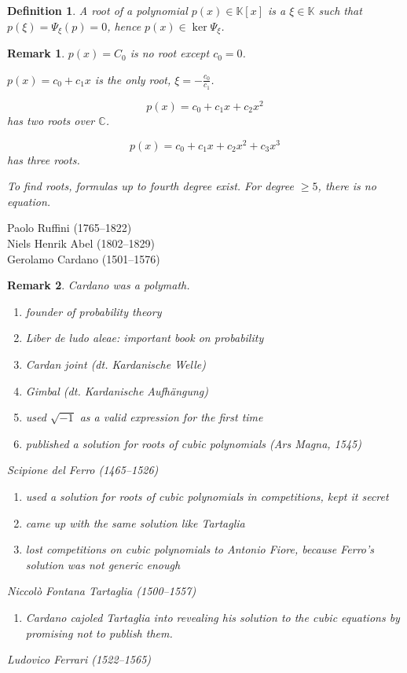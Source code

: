 \documentclass{article}
\newtheorem{definition}{Definition}  \numberwithin{definition}{section}
\newtheorem{remark}{Remark}  \numberwithin{remark}{section}
\begin{document}
\begin{definition}
  A \emph{root of a polynomial} $p(x) \in \mathbb K[x]$ is a $\xi \in \mathbb K$ such that $p(\xi) = \Psi_{\xi}(p) = 0$,
  hence $p(x) \in \ker{\Psi_{\xi}}$.
\end{definition}

\begin{remark}
  $p(x) = C_0$ is no root except $c_0 = 0$.

  $p(x) = c_0 + c_1 x$ is the only root, $\xi = -\frac{c_0}{c_1}$.

  \[ p(x) = c_0 + c_1 x + c_2 x^2 \]
  has two roots over $\mathbb C$.

  \[ p(x) = c_0 + c_1 x + c_2 x^2 + c_3 x^3 \]
  has three roots.

  To find roots, formulas up to fourth degree exist.
  For degree $\geq 5$, there is no equation.
\end{remark}

Paolo Ruffini (1765--1822) \\
Niels Henrik Abel (1802--1829) \\
Gerolamo Cardano (1501--1576)

\begin{remark}
  Cardano was a polymath.
  \begin{enumerate}
    \item founder of probability theory
    \item \emph{Liber de ludo aleae}: important book on probability
    \item Cardan joint (dt. \foreignlanguage{german}{Kardanische Welle})
    \item Gimbal (dt. \foreignlanguage{german}{Kardanische Aufh\"angung})
    \item used $\sqrt{-1}$ as a valid expression for the first time
    \item published a solution for roots of cubic polynomials (Ars Magna, 1545)
  \end{enumerate}

  Scipione del Ferro (1465--1526)

  \begin{enumerate}
    \item used a solution for roots of cubic polynomials in competitions, kept it secret
    \item came up with the same solution like Tartaglia
    \item lost competitions on cubic polynomials to Antonio Fiore, because Ferro's solution was not generic enough
  \end{enumerate}

  Niccol\`o Fontana Tartaglia (1500--1557)

  \begin{enumerate}
    \item Cardano cajoled Tartaglia into revealing his solution to the cubic equations by promising not to publish them.
  \end{enumerate}

  Ludovico Ferrari (1522--1565)
\end{remark}
\end{document}

